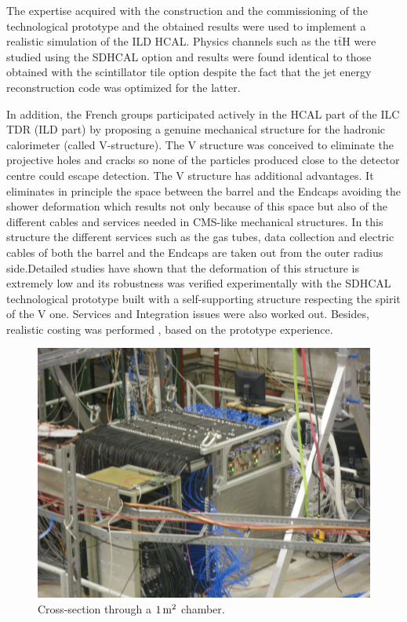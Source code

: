 The expertise acquired with the construction and
the commissioning of the technological prototype and the obtained results were
used to implement a realistic simulation of the ILD HCAL. Physics channels such
as the $\mathrm{t} \bar{\mathrm{t}}\mathrm{H}$ were studied using the SDHCAL option and results were found
identical to those obtained with the scintillator tile option despite the fact
that the jet energy reconstruction code was optimized for the latter.

In addition, the French groups participated actively in the HCAL part of the
ILC TDR (ILD part) by proposing a genuine mechanical structure for the hadronic
calorimeter (called V-structure). The V structure was conceived to eliminate
the projective holes and cracks so none of the particles produced close to the
detector centre could escape detection. The V structure has additional
advantages. It eliminates in principle the space between the barrel and the
Endcaps avoiding the shower deformation which results not only because of
this space but also of the different cables and services needed in CMS-like
mechanical structures. In this structure the different services such as the
gas tubes, data collection and electric cables of both the barrel and the
Endcaps are taken out from the outer radius side.Detailed studies have shown
that the deformation of this structure is extremely low and its robustness was
verified experimentally with the SDHCAL technological prototype built with a
self-supporting structure respecting the spirit of the V one. Services and
Integration issues were also worked out. Besides, realistic costing was
performed , based on the prototype experience.

\begin{figure}
\centerline{\includegraphics[width=0.50\columnwidth]{Calorimeter/SDHCAL_GRPC/figures/prototype.JPG}}
\caption{Cross-section through a $\unit[1]{m^2}$ chamber.}\label{fig:Calorimeter:SDHCAL_GRPC:prototype}
\end{figure}




